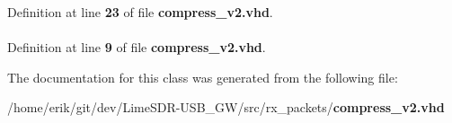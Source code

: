 Definition at line {\bf 23} of file {\bf compress\+\_\+v2.\+vhd}.

\paragraph[{std\+\_\+logic\+\_\+1164}]{\hspace{0.3cm}{\ttfamily [Package]}}\label{classcompress__v2_acd03516902501cd1c7296a98e22c6fcb}


Definition at line {\bf 9} of file {\bf compress\+\_\+v2.\+vhd}.



The documentation for this class was generated from the following file\+:\begin{DoxyCompactItemize}
\item 
/home/erik/git/dev/\+Lime\+S\+D\+R-\/\+U\+S\+B\+\_\+\+G\+W/src/rx\+\_\+packets/{\bf compress\+\_\+v2.\+vhd}\end{DoxyCompactItemize}

